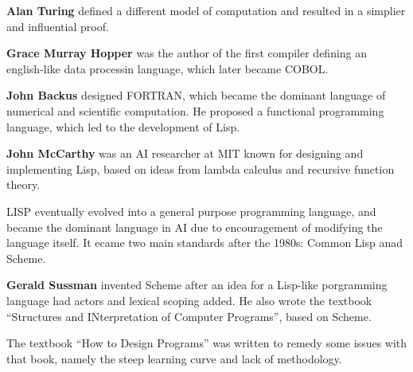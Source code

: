 \documentclass[english, 12pt]{article}
\begin{document}
\begin{exmp}
\textbf{Alan Turing} defined a different model of computation and resulted in a simplier and influential proof.
\end{exmp}
\begin{exmp}
\textbf{Grace Murray Hopper} was the author of the first compiler defining an english-like data processin language, which later became COBOL.
\end{exmp}
\begin{exmp}
\textbf{John Backus} designed FORTRAN, which became the dominant language of numerical and scientific computation. He proposed a functional programming language, which led to the development of Lisp.
\end{exmp}
\begin{exmp}
\textbf{John McCarthy} was an AI researcher at MIT known for designing and implementing Lisp, based on ideas from lambda calculus and recursive function theory.
\end{exmp}
\n
LISP eventually evolved into a general purpose programming language, and became the dominant language in AI due to encouragement of modifying the language itself. It ecame two main standards after the 1980s: Common Lisp anad Scheme.
\begin{exmp}
\textbf{Gerald Sussman} invented Scheme after an idea for a Lisp-like porgramming language had actors and lexical scoping added. He also wrote the textbook ``Structures and INterpretation of Computer Programs'', based on Scheme.
\end{exmp}
\begin{exmp}
The textbook ``How to Design Programs'' was written to remedy some issues with that book, namely the steep learning curve and lack of methodology.
\end{exmp}
\end{document}
